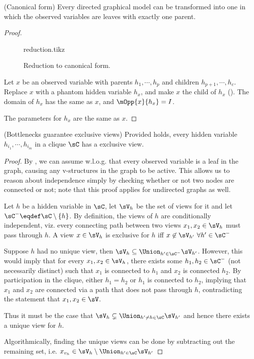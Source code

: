 \begin{lemma}(Canonical form) 
  \label{lem:reduction}
  Every directed graphical model can be transformed into one in which
  the observed variables are leaves with exactly one parent.
\end{lemma}
\begin{proof}
  \begin{figure}
    \label{fig:reduction}
    \centering
    {reduction.tikz}
    \caption{Reduction to canonical form.}
  \end{figure}

  Let $x$ be an observed variable with parents $h_1, \cdots, h_p$ and
  children $h_{p+1}, \cdots, h_c$. Replace $x$ with a phantom hidden
  variable $h_x$, and make $x$ the child of $h_x$ (). The domain of $h_x$
  has the same as $x$, and $\mOpp{x}{h_x} = I$.

  The parameters for $h_x$ are the same as $x$.
\end{proof}

\begin{lemma}(Bottlenecks guarantee exclusive views)
  Provided  holds, every hidden variable
    $h_{i_1}, \cdots, h_{i_m}$ in a clique $\sC$ has a exclusive view.
\end{lemma}
\begin{proof}
  By , we can assume w.l.o.g. that every observed
  variable is a leaf in the graph, causing any v-structures in the graph
  to be active. This allows us to reason about independence simply by
  checking whether or not two nodes are connected or not; note that this
  proof applies for undirected graphs as well.

  Let $h$ be a hidden variable in $\sC$, let $\sV_{h}$ be the set of
    views for it and let $\sC^- \eqdef \sC \setminus \{h\}$.
  By definition, the views of $h$ are conditionally independent, viz.
    every connecting path between two views $x_1, x_2 \in \sV_h$ must pass through
    $h$.
  A view $x \in \sV_{h}$ is exclusive for $h$ iff $x \not\in \sV_{h'} ~ \forall h'
  \in \sC^-$

  Suppose $h$ had no unique view, then $\sV_{h} \subseteq \Union_{h' \in \sC^-} \sV_{h'}$. 
  However, this would imply that for every $x_1, x_2 \in \sV_{h}$, there
    exists some $h_1, h_2 \in \sC^-$ (not necessarily distinct) such that
    $x_1$ is connected to $h_1$ and $x_2$ is connected $h_2$.
  By participation in the clique, either $h_1 = h_2$ or $h_1$ is
    connected to $h_2$, implying that $x_1$ and $x_2$ are connected
    via a path that does not pass through $h$, contradicting the
    statement that $x_1, x_2 \in \sV$. 
    
  Thus it must be the case that $\sV_{h} \subsetneq \Union_{h' \neq
    h \in \sC} \sV_{h'}$ and hence there exists a unique view for $h$.

  Algorithmically, finding the unique views can be done by subtracting
    out the remaining set, i.e. $x_{v_h} \in \sV_h \setminus \Union_{h'
    \in \sC} \sV_{h'}$
\end{proof}

